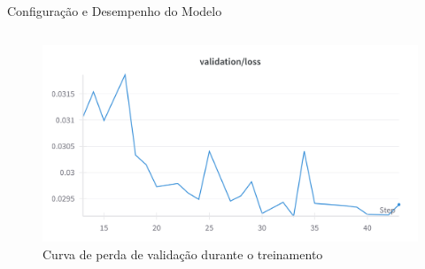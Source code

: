 \documentclass[aspectratio=169,xcolor=dvipsnames]{beamer}
\begin{document}
\begin{frame}{Configuração e Desempenho do Modelo}
\begin{columns}[T]
\begin{column}{0.48\textwidth}
      
      \centering
      \begin{figure}
        \centering
        \includegraphics[width=\textwidth]{logos/validation_loss.png}
        \caption{Curva de perda de validação durante o treinamento}
      \end{figure}
    \end{column}
  \end{columns}
\end{frame}
\end{document}
